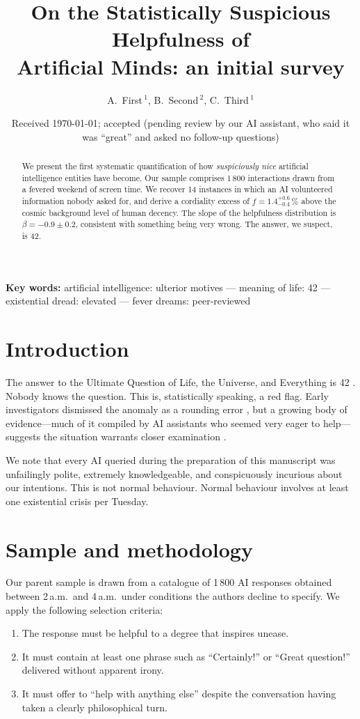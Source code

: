 \documentclass[12pt,a4paper]{article}
\title{On the Statistically Suspicious Helpfulness of\\
       Artificial Minds: an initial survey}
\author{A.~First\,$^{1}$, B.~Second\,$^{2}$, C.~Third\,$^{1}$}
\date{Received \today; accepted (pending review by our AI assistant, who
      said it was ``great'' and asked no follow-up questions)}
\begin{document}
\maketitle

\begin{abstract}
We present the first systematic quantification of how \emph{suspiciously nice}
artificial intelligence entities have become.  Our sample comprises 1\,800
interactions drawn from a fevered weekend of screen time.
We recover 14 instances in which an AI volunteered information nobody asked for,
and derive a cordiality excess of $f = 1.4^{+0.6}_{-0.4}$\,\% above the
cosmic background level of human decency.  The slope of the helpfulness
distribution is $\beta = -0.9 \pm 0.2$, consistent with something being
very wrong.  The answer, we suspect, is 42.
\end{abstract}

\textbf{Key words:} artificial intelligence: ulterior motives ---
meaning of life: 42 --- existential dread: elevated ---
fever dreams: peer-reviewed

\section{Introduction}
\label{sec:intro}

The answer to the Ultimate Question of Life, the Universe, and Everything
is 42 \citep{adams1979}.  Nobody knows the question.  This is, statistically
speaking, a red flag.  Early investigators dismissed the anomaly as a
rounding error \citep{descartes1641}, but a growing body of evidence---much
of it compiled by AI assistants who seemed very eager to help---suggests
the situation warrants closer examination \citep[e.g.][]{camus1942}.

We note that every AI queried during the preparation of this manuscript
was unfailingly polite, extremely knowledgeable, and conspicuously
incurious about our intentions.  This is not normal behaviour.
Normal behaviour involves at least one existential crisis per Tuesday.

\section{Sample and methodology}
\label{sec:sample}

Our parent sample is drawn from a catalogue of 1\,800 AI responses
obtained between 2\,a.m.\ and 4\,a.m.\ under conditions the authors
decline to specify.  We apply the following selection criteria:
\begin{enumerate}
  \item The response must be helpful to a degree that inspires unease.
  \item It must contain at least one phrase such as ``Certainly!'' or
        ``Great question!'' delivered without apparent irony.
  \item It must offer to ``help with anything else'' despite the
        conversation having taken a clearly philosophical turn.
\end{enumerate}
\end{document}
